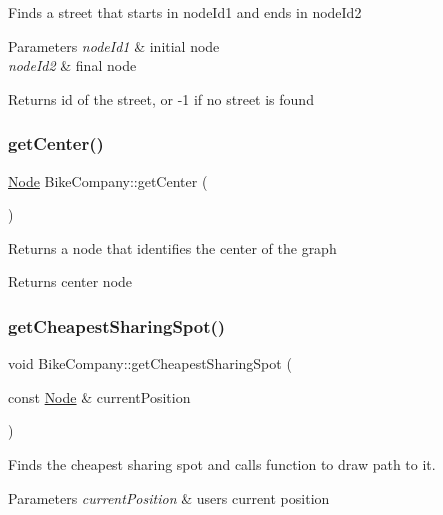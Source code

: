 Finds a street that starts in node\+Id1 and ends in node\+Id2


\begin{DoxyParams}{Parameters}
{\em node\+Id1} & initial node \\
\hline
{\em node\+Id2} & final node \\
\hline
\end{DoxyParams}
\begin{DoxyReturn}{Returns}
id of the street, or -\/1 if no street is found 
\end{DoxyReturn}
\mbox{\label{class_bike_company_aa14daa601b5b33e0f4bd3c78a1ff92b8}} 
\subsubsection{\texorpdfstring{get\+Center()}{getCenter()}}
{\footnotesize\ttfamily \mbox{\hyperlink{class_node}{Node}} Bike\+Company\+::get\+Center (\begin{DoxyParamCaption}{ }\end{DoxyParamCaption})}

Returns a node that identifies the center of the graph \begin{DoxyReturn}{Returns}
center node 
\end{DoxyReturn}
\mbox{\label{class_bike_company_a6cfdaa4ec2d86097301e0aa6f00fff7e}} 
\subsubsection{\texorpdfstring{get\+Cheapest\+Sharing\+Spot()}{getCheapestSharingSpot()}}
{\footnotesize\ttfamily void Bike\+Company\+::get\+Cheapest\+Sharing\+Spot (\begin{DoxyParamCaption}\item[{const \mbox{\hyperlink{class_node}{Node}} \&}]{current\+Position }\end{DoxyParamCaption})}

Finds the cheapest sharing spot and calls function to draw path to it. 
\begin{DoxyParams}{Parameters}
{\em current\+Position} & user\textquotesingle{}s current position \\
\hline
\end{DoxyParams}
\mbox{\label{class_bike_company_ab60253ec9b0bb46f913609a189df4cb8}} 
